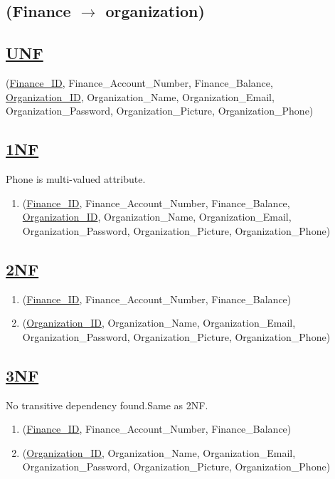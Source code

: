 \subsection{\texorpdfstring{\centering (Finance $\rightarrow$ organization)}{(Finance-organization)}}

\subsection*{\underline{UNF}}

(\underline{Finance\_ID}, Finance\_Account\_Number, Finance\_Balance,\\
\underline{Organization\_ID}, Organization\_Name, Organization\_Email, Organization\_Password, Organization\_Picture, Organization\_Phone)

\subsection*{\underline{1NF}}
Phone is multi-valued attribute.
\vskip 0.2in

\begin{enumerate}
    \item
          (\underline{Finance\_ID}, Finance\_Account\_Number, Finance\_Balance,\\
          \underline{Organization\_ID}, Organization\_Name, Organization\_Email, Organization\_Password, Organization\_Picture, Organization\_Phone)
\end{enumerate}

\subsection*{\underline{2NF}}
\begin{enumerate}
    \item (\underline{Finance\_ID}, Finance\_Account\_Number, Finance\_Balance)
    \item (\underline{Organization\_ID}, Organization\_Name, Organization\_Email, Organization\_Password, Organization\_Picture, Organization\_Phone)
\end{enumerate}

\subsection*{\underline{3NF}}
No transitive dependency found.Same as 2NF.
\begin{enumerate}
    \item (\underline{Finance\_ID}, Finance\_Account\_Number, Finance\_Balance)
    \item (\underline{Organization\_ID}, Organization\_Name, Organization\_Email, Organization\_Password, Organization\_Picture, Organization\_Phone)
\end{enumerate}

